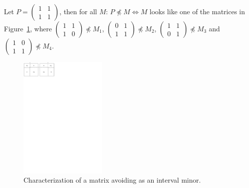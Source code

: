 \documentclass[12pt,a4paper]{report}
\begin{document}
\begin{thm}
Let $P=\left(\begin{smallmatrix}1&1\\1&1\end{smallmatrix}\right)$, then for all $M$: $P\not\preceq M\Leftrightarrow M$ looks like one of the matrices in Figure~\ref{p22}, where $\left(\begin{smallmatrix}1&1\\1&0\end{smallmatrix}\right)\not\preceq M_1$, $\left(\begin{smallmatrix}0&1\\1&1\end{smallmatrix}\right)\not\preceq M_2$, $\left(\begin{smallmatrix}1&1\\0&1\end{smallmatrix}\right)\not\preceq M_3$ and  $\left(\begin{smallmatrix}1&0\\1&1\end{smallmatrix}\right)\not\preceq M_4$.
\end{thm}
\begin{figure}[h!]
\centering
\includegraphics[height=60mm]{img/p22.pdf}
\caption{Characterization of a matrix avoiding \usebox{\smlmatb} as an interval minor.}
\label{p22}
\end{figure}
\end{document}
